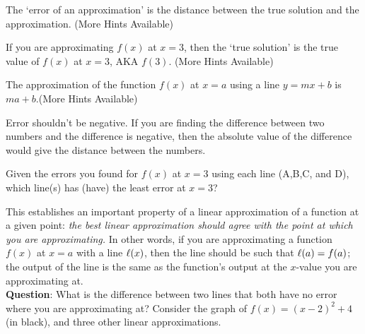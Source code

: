 \documentclass[handout,nooutcomes]{ximera}
\begin{document}
\begin{question}
\begin{hint}
The `error of an approximation' is the distance between the true solution
and the approximation. (More Hints Available)
\end{hint}
\begin{hint}
If you are approximating $f(x)$ at $x=3$, then the `true solution' is the
true value of $f(x)$ at $x=3$, AKA $f(3)$. (More Hints Available)
\end{hint}
\begin{hint}
The approximation of the function $f(x)$ at $x=a$ using a line 
$y=mx+b$ is $ma+b$.(More Hints Available)
\end{hint}
\begin{hint}
Error shouldn't be negative. If you are finding the difference
between two numbers and the difference is negative, then the absolute
value of the difference would give the distance between the numbers.
\end{hint}
\end{question}

\begin{question}
Given the errors you found for $f(x)$ at $x=3$ using  each line (A,B,C, and D), which line(s) has (have) the least error at $x=3$?
\begin{selectAll}
\end{selectAll}
\end{question}


This establishes an important property of a linear approximation
of a function at a given point: {\it the best linear approximation
should agree with the point at which you are approximating.}
In other words, if you are approximating a function $f(x)$ at $x=a$ with a
line $\ell(x)$, then the line should be such that $\ell(a)=f(a)$;
the output of the line is the same as the function's output at the $x$-value you are approximating at.\\

\textbf{Question}: What is the difference between two lines that both
have no error where you are approximating at?
Consider the graph of $f(x)= (x-2)^2 + 4$ (in black), and three other linear approximations.
\end{document}
